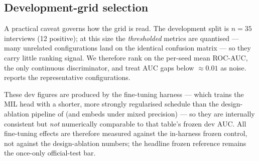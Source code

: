 \documentclass[conference]{IEEEtran}
\begin{document}
\subsection{Development-grid selection}
\label{sec:finetune-iter1}

A practical caveat governs how the grid is read. The development split is
$n\!=\!35$ interviews (12 positive); at this size the \emph{thresholded} metrics
are quantised --- many unrelated configurations land on the identical confusion
matrix --- so they carry little ranking signal. We therefore rank on the
per-seed mean ROC-AUC, the only continuous discriminator, and treat AUC gaps
below $\approx\!0.01$ as noise.  reports the representative
configurations.

These dev figures are produced by the fine-tuning harness --- which trains the
MIL head with a shorter, more strongly regularised schedule than the
design-ablation pipeline of  (and embeds under mixed
precision) --- so they are internally consistent but \emph{not} numerically
comparable to that table's frozen dev AUC. All fine-tuning effects are therefore
measured against the in-harness frozen control, not against the design-ablation
numbers; the headline frozen reference remains the once-only official-test bar.
\end{document}
